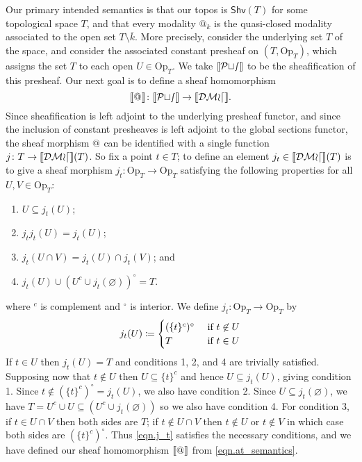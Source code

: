 \documentclass[11pt, oneside, article]{memoir}
\makeatletter
\theoremstyle{plain}
\theoremstyle{definition}
\theoremstyle{remark}
\renewcommand{\ss}{\subseteq}
\DeclarePairedDelimiter{\church}{\llbracket}{\rrbracket}
\newcommand{\Set}[1]{\mathrm{#1}}
\newcommand{\Fun}[1]{\mathsf{#1}}
\newcommand{\tn}[1]{\textnormal{#1}}
\newcommand{\shv}{\Fun{Shv}}
\newcommand{\Op}{\Set{Op}}
\newcommand{\pt}{k}				%
\newcommand{\Pts}{\mathcal{Pts}}		%
\newcommand{\decmod}{\mathcal{DMod}}
\newcommand{\AtSymbol}{{@}}
\newcommand{\At}[1][\pt]{\AtSymbol_{#1}}
\makeatother
\begin{document}
Our primary intended semantics is that our topos is $\shv(T)$ for some topological space $T$, and that every modality $\At$ is the quasi-closed modality associated to the open set $T \setminus \overline{k}$. More precisely, consider the underlying set $T$ of the space, and consider the associated constant presheaf on $(T,\Op_T)$, which assigns the set $T$ to each open $U\in\Op_T$. We take $\church{\Pts}$ to be the sheafification of this presheaf. Our next goal is to define a sheaf homomorphism
\begin{equation}\label{eqn.at_semantics}
	\church{\At[]}\colon\church{\Pts}\to\church{\decmod}.
\end{equation}
Since sheafification is left adjoint to the underlying presheaf functor, and since the inclusion of constant presheaves is left adjoint to the global sections functor, the sheaf morphism $\At[]$ can be identified with a single function $j\colon T\to\church{\decmod}(T)$. So fix a point $t\in T$; to define an element $j_t\in\church{\decmod}(T)$ is to give a sheaf morphism $j_t\colon\Op_T\to\Op_T$ satisfying the following properties for all $U,V\in\Op_T$:
\begin{enumerate}
	\item $U\ss j_t(U)$;
	\item $j_t j_t(U)=j_t(U)$;
	\item $j_t(U\cap V)=j_t(U)\cap j_t(V)$; and
	\item $j_t(U)\cup (U^c\cup j_t(\varnothing))^\circ=T$.
\end{enumerate}
where $^c$ is complement and $^\circ$ is interior. We define $j_t\colon\Op_T\to\Op_T$ by
\begin{equation}\label{eqn.j_t}
	j_t(U)\coloneqq
	\begin{cases}
		(\{t\}^c)^\circ&\tn{ if }t\not\in U\\
		T&\tn{ if } t\in U
	\end{cases}
\end{equation}
If $t\in U$ then $j_t(U)=T$ and conditions 1, 2, and 4 are trivially satisfied. Supposing now that $t\not\in U$ then $U\ss \{t\}^c$ and hence $U\ss j_t(U)$, giving condition 1. Since $t\not\in(\{t\}^c)^\circ=j_t(U)$, we also have condition 2. Since $U\ss j_t(\varnothing)$, we have $T=U^c\cup U\ss (U^c\cup j_t(\varnothing))$ so we also have condition 4. For condition 3, if $t\in U\cap V$ then both sides are $T$; if $t\not\in U\cap V$ then $t\not\in U$ or $t\not\in V$ in which case both sides are $(\{t\}^c)^\circ$. Thus \eqref{eqn.j_t} satisfies the necessary conditions, and we have defined our sheaf homomorphism $\church{\At[]}$ from \eqref{eqn.at_semantics}.
\end{document}
